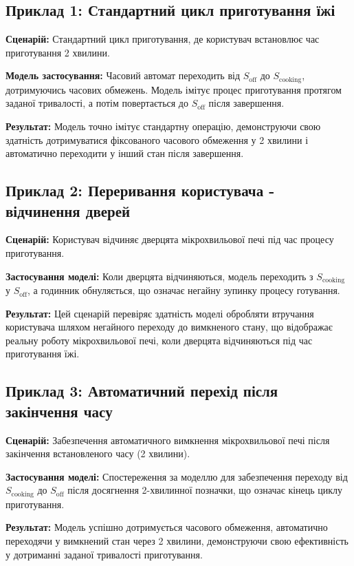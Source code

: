 \documentclass[12pt,a4paper]{article}
\begin{document}
\subsection{Приклад 1: Стандартний цикл приготування їжі}
\textbf{Сценарій:} Стандартний цикл приготування, де користувач встановлює час приготування 2 хвилини.

\textbf{Модель застосування:} Часовий автомат переходить від \( S_{\text{off}} \) до \( S_{\text{cooking}} \), дотримуючись часових обмежень. Модель імітує процес приготування протягом заданої тривалості, а потім повертається до \( S_{\text{off}} \) після завершення.

\textbf{Результат:} Модель точно імітує стандартну операцію, демонструючи свою здатність дотримуватися фіксованого часового обмеження у 2 хвилини і автоматично переходити у інший стан після завершення.

\subsection{Приклад 2: Переривання користувача - відчинення дверей}
\textbf{Сценарій:} Користувач відчиняє дверцята мікрохвильової печі під час процесу приготування.

\textbf{Застосування моделі:} Коли дверцята відчиняються, модель переходить з \( S_{\text{cooking}} \) у \( S_{\text{off}} \), а годинник обнуляється, що означає негайну зупинку процесу готування.

\textbf{Результат:} Цей сценарій перевіряє здатність моделі обробляти втручання користувача шляхом негайного переходу до вимкненого стану, що відображає реальну роботу мікрохвильової печі, коли дверцята відчиняються під час приготування їжі.

\subsection{Приклад 3: Автоматичний перехід після закінчення часу}
\textbf{Сценарій:} Забезпечення автоматичного вимкнення мікрохвильової печі після закінчення встановленого часу (2 хвилини).

\textbf{Застосування моделі:} Спостереження за моделлю для забезпечення переходу від \( S_{\text{cooking}} \) до \( S_{\text{off}} \) після досягнення 2-хвилинної позначки, що означає кінець циклу приготування.

\textbf{Результат:} Модель успішно дотримується часового обмеження, автоматично переходячи у вимкнений стан через 2 хвилини, демонструючи свою ефективність у дотриманні заданої тривалості приготування.
\end{document}
